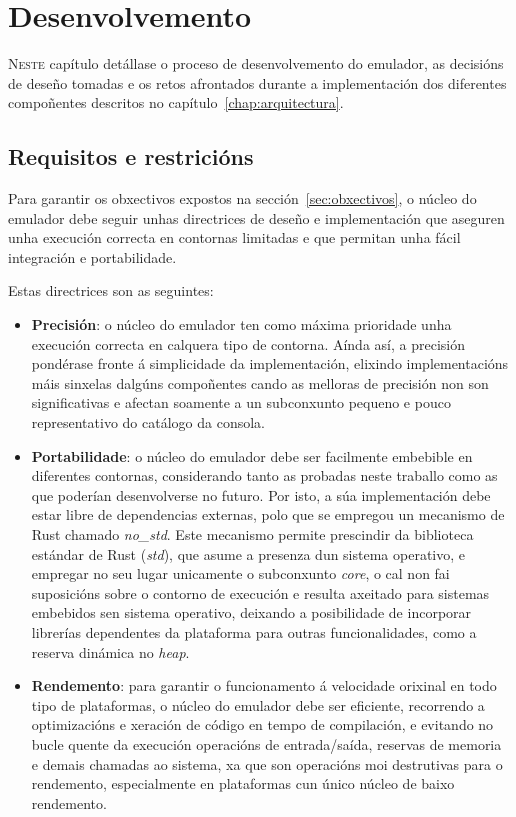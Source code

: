 \chapter{Desenvolvemento}
\label{chap:implementacion}

\lettrine{N}{este} capítulo detállase o proceso de desenvolvemento do emulador,
as decisións de deseño tomadas e os retos afrontados durante a implementación
dos diferentes compoñentes descritos no capítulo~\ref{chap:arquitectura}.

\section{Requisitos e restricións}
\label{sec:requisitos}
Para garantir os obxectivos expostos na sección~\ref{sec:obxectivos}, o núcleo do emulador
debe seguir unhas directrices de deseño e implementación
que aseguren unha execución correcta en contornas limitadas e que permitan unha fácil integración e portabilidade.

Estas directrices son as seguintes:

\begin{itemize}
  \item \textbf{Precisión}: o núcleo do emulador ten como máxima prioridade unha execución correcta en calquera tipo de contorna.
  Aínda así, a precisión pondérase fronte á simplicidade da implementación, elixindo implementacións máis sinxelas dalgúns compoñentes
  cando as melloras de precisión non son significativas e afectan soamente a un subconxunto pequeno e pouco representativo do catálogo da consola.

  \item \textbf{Portabilidade}: o núcleo do emulador debe ser facilmente embebible en diferentes contornas, considerando tanto as probadas neste traballo como as
  que poderían desenvolverse no futuro. Por isto, a súa implementación debe estar libre de dependencias externas, polo que se empregou un mecanismo
  de Rust chamado \textit{no\_std}. Este mecanismo permite prescindir da biblioteca estándar de Rust (\textit{std}), que asume a presenza dun sistema operativo,
  e empregar no seu lugar unicamente o subconxunto \textit{core}, o cal non fai suposicións sobre o contorno de execución e resulta axeitado para sistemas embebidos
  sen sistema operativo, deixando a posibilidade de incorporar librerías dependentes da plataforma para outras funcionalidades, como a reserva dinámica no \textit{heap}.

  \item \textbf{Rendemento}: para garantir o funcionamento á velocidade orixinal en todo tipo de plataformas, o núcleo do emulador debe ser eficiente,
  recorrendo a optimizacións e xeración de código en tempo de compilación, e evitando no bucle quente da execución operacións de entrada/saída, reservas de
  memoria e demais chamadas ao sistema, xa que son operacións moi destrutivas para o rendemento, especialmente en plataformas cun único núcleo de baixo
  rendemento.
\end{itemize} 


